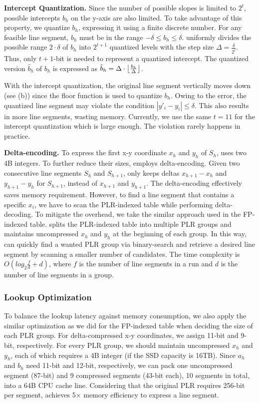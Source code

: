 \textbf{Intercept Quantization.}
Since the number of possible slopes is limited to $2^t$, possible intercepts
$b_h$ on the y-axis are also limited.  To take advantage of this
property, we quantize $b_h$, expressing it using a finite discrete
number. 
For any feasible line segment, $b_h$ must be in the range $-\delta\leq
b_h\leq\delta$. \ours{} uniformly divides the possible range $2 \cdot
\delta$ of $b_h$ into $2^{t+1}$ quantized levels with the step size
$\Delta = \frac{\delta}{2^t}$.  Thus, only $t+1$-bit is needed to represent a
quantized intercept.  The quantized version $\hat b_h$ of $b_h$
is expressed as $\hat b_h = \Delta \cdot \floor*{\frac{b_h}{\Delta}}$.  

With the intercept quantization, the original line segment
vertically moves down (see (b)) 
since the floor function is used to quantize $b_h$.
Owing to the error, the quantized line segment may violate the condition 
$|y'_i-y_i|\leq\delta$.
This also results in more line segments, wasting memory.
Currently, we use the same $t=11$ for the intercept
quantization which is large enough. The violation rarely happens in
practice.  

\textbf{Delta-encoding.}
To express the first x-y coordinate $x_h$ and $y_h$ of $S_h$,
\ours{} uses two 4B integers.
To further reduce their sizes, \ours{} employs delta-encoding.  
Given two consecutive
line segments $S_h$ and $S_{h+1}$, \ours{} only keeps 
deltas $x_{h+1} - x_{h}$ and $y_{h+1} - y_h$ for $S_{h+1}$, instead of
$x_{h+1}$ and $y_{h+1}$.
The delta-encoding effectively saves memory requirement.
However, to find a line segment that contains a specific $x_i$, we have
to scan the PLR-indexed table while performing delta-decoding.  
To mitigate the overhead, we take the similar approach used in the FP-indexed table.
\ours{} splits the PLR-indexed table into multiple PLR groups
and maintains uncompressed $x_h$ and $y_h$ at the beginning of each group.
In this way, 
\ours{} can quickly find a wanted PLR group via binary-search 
and retrieve a desired line segment by scanning a smaller number of candidates.
The time complexity 
is $O(log_{2}\frac{f}{d}+d)$, where $f$ is the number of line segments in a run
and $d$ is the number of line segments in a group.

\subsubsection{Lookup Optimization}
To balance the lookup latency against memory consumption,
we also apply the similar optimization as we did for the FP-indexed table
when deciding the size of each PLR group.
For delta-compressed x-y coordinates,
we assign 11-bit and 9-bit, respectively.
For every PLR group, we should maintain uncompressed $x_h$ and $y_h$,
each of which requires a 4B integer (if the SSD capacity is 16TB).
Since $a_h$ and $b_h$ need 11-bit and 12-bit, respectively, 
we can pack one uncompressed segment (87-bit) and 
9 compressed segments (43-bit each), 10 segments in total,
into a 64B CPU cache line. Considering that 
the original PLR requires 256-bit per segment, \ours{} achieves 5$\times$ memory efficiency to express a line segment.


